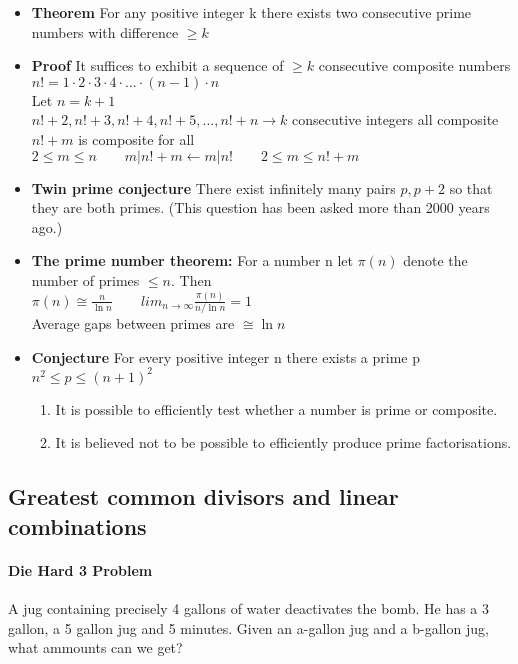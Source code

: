 \documentclass[9pt, letterpaper, oneside]{article}
\begin{document}
\begin{itemize}
    \item \textbf{Theorem} For any positive integer k there exists two consecutive prime numbers with difference $\geq k$
    \item \textbf{Proof} It suffices to exhibit a sequence of $\geq k$ consecutive composite numbers\\
            $n! = 1 \cdot 2 \cdot 3 \cdot 4 \cdot ... \cdot (n-1) \cdot n$\\
            Let $n = k + 1$\\
            $n! + 2, n! + 3, n! + 4, n! + 5,..., n! + n \to k$ consecutive integers all composite\\
            $n! + m$ is composite for all $2 \leq m \leq n \qquad m | n! + m \leftarrow m| n! \qquad 2 \leq m \leq n! + m$
    \item \textbf{Twin prime conjecture} There exist infinitely many pairs $p, p+2$ so that they are both primes. (This question has been asked more than 2000 years ago.)
    \item \textbf{The prime number theorem:} For a number n let $\pi(n)$ denote the number of primes $\leq n$. Then \\
            $\pi(n) \cong \frac{n}{\ln n} \qquad lim_{n \to \infty} \frac{\pi(n)}{n / \ln n} = 1$ \\
            Average gaps between primes are $\cong \ln n$ 
    \item \textbf{Conjecture} For every positive integer n there exists a prime p $n^2 \leq p \leq (n+1)^2$
    \begin{enumerate}
        \item It is possible to efficiently test whether a number is prime or composite.
        \item It is believed not to be possible to efficiently produce prime factorisations.
    \end{enumerate}
\end{itemize}

\subsection{Greatest common divisors and linear combinations}

\paragraph{Die Hard 3 Problem} A jug containing precisely 4 gallons of water deactivates the bomb. He has a 3 gallon, a 5 gallon jug and 5 minutes. Given an a-gallon jug and a b-gallon jug, what ammounts can we get?
\end{document}
